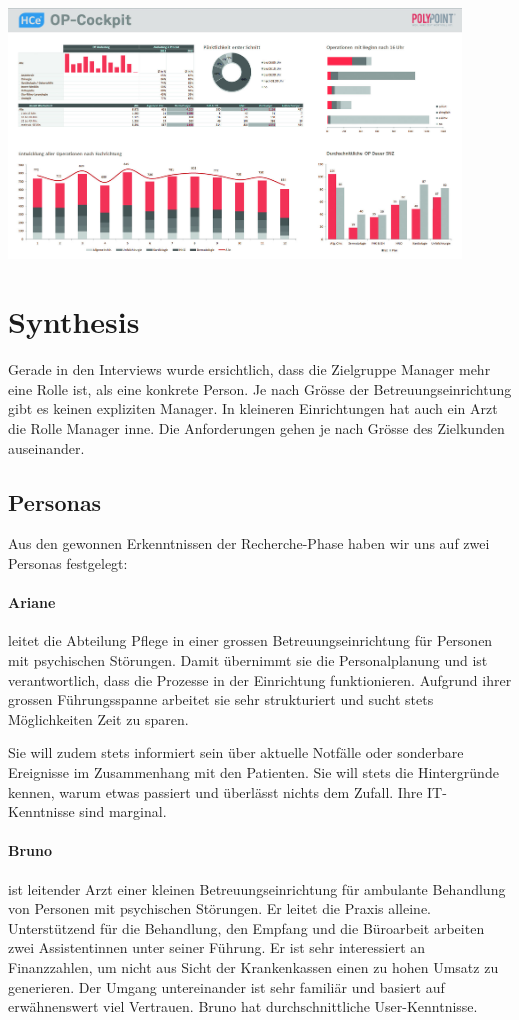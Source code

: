 \documentclass[a4paper]{scrreprt}
\begin{document}
\includegraphics[width=0.9\textwidth]{img/research_polypoint_op-cockpit.jpg}



\section{Synthesis}
Gerade in den Interviews wurde ersichtlich, dass die Zielgruppe Manager mehr eine Rolle ist, als eine konkrete Person. Je nach Grösse der Betreuungseinrichtung gibt es keinen expliziten Manager. In kleineren Einrichtungen hat auch ein Arzt die Rolle Manager inne.
Die Anforderungen gehen je nach Grösse des Zielkunden auseinander.

\subsection{Personas}
Aus den gewonnen Erkenntnissen der Recherche-Phase haben wir uns auf zwei Personas festgelegt:

\paragraph{Ariane} leitet die Abteilung Pflege in einer grossen Betreuungseinrichtung für Personen mit psychischen Störungen. Damit übernimmt sie die Personalplanung und ist verantwortlich, dass die Prozesse in der Einrichtung funktionieren. Aufgrund ihrer grossen Führungsspanne arbeitet sie sehr strukturiert und sucht stets Möglichkeiten Zeit zu sparen.

Sie will zudem stets informiert sein über aktuelle Notfälle oder sonderbare Ereignisse im Zusammenhang mit den Patienten. Sie will stets die Hintergründe kennen, warum etwas passiert und überlässt nichts dem Zufall. Ihre IT-Kenntnisse sind marginal.


\paragraph{Bruno} ist leitender Arzt einer kleinen Betreuungseinrichtung für ambulante Behandlung von Personen mit psychischen Störungen. Er leitet die Praxis alleine. Unterstützend für die Behandlung, den Empfang und die Büroarbeit arbeiten zwei Assistentinnen unter seiner Führung. Er ist sehr interessiert an Finanzzahlen, um nicht aus Sicht der Krankenkassen einen zu hohen Umsatz zu generieren. Der Umgang untereinander ist sehr familiär und basiert auf erwähnenswert viel Vertrauen. Bruno hat durchschnittliche User-Kenntnisse.
\end{document}
